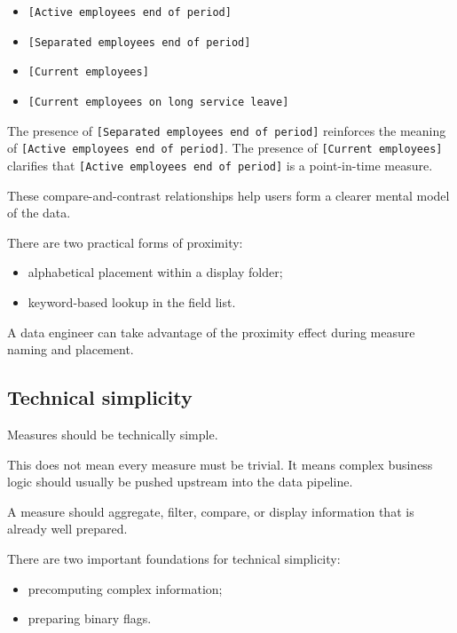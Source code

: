 \documentclass[10pt,openany,10pt]{book}
\providecommand{\tightlist}{%
  \setlength{\itemsep}{0pt}\setlength{\parskip}{0pt}}
\begin{document}
\begin{itemize}
\tightlist
\item
  \texttt{{[}Active\ employees\ end\ of\ period{]}}
\item
  \texttt{{[}Separated\ employees\ end\ of\ period{]}}
\item
  \texttt{{[}Current\ employees{]}}
\item
  \texttt{{[}Current\ employees\ on\ long\ service\ leave{]}}
\end{itemize}

The presence of \texttt{{[}Separated\ employees\ end\ of\ period{]}}
reinforces the meaning of
\texttt{{[}Active\ employees\ end\ of\ period{]}}. The presence of
\texttt{{[}Current\ employees{]}} clarifies that
\texttt{{[}Active\ employees\ end\ of\ period{]}} is a point-in-time
measure.

These compare-and-contrast relationships help users form a clearer
mental model of the data.

There are two practical forms of proximity:

\begin{itemize}
\tightlist
\item
  alphabetical placement within a display folder;
\item
  keyword-based lookup in the field list.
\end{itemize}

A data engineer can take advantage of the proximity effect during
measure naming and placement.

\subsection{Technical simplicity}\label{technical-simplicity}

Measures should be technically simple.

This does not mean every measure must be trivial. It means complex
business logic should usually be pushed upstream into the data pipeline.

A measure should aggregate, filter, compare, or display information that
is already well prepared.

There are two important foundations for technical simplicity:

\begin{itemize}
\tightlist
\item
  precomputing complex information;
\item
  preparing binary flags.
\end{itemize}
\end{document}
